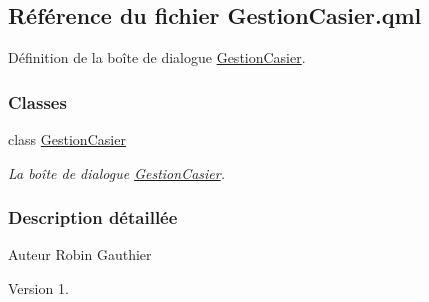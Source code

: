 \hypertarget{_gestion_casier_8qml}{}\subsection{Référence du fichier Gestion\+Casier.\+qml}
\label{_gestion_casier_8qml}


Définition de la boîte de dialogue \hyperlink{class_gestion_casier}{Gestion\+Casier}.  


\subsubsection*{Classes}
\begin{DoxyCompactItemize}
\item 
class \hyperlink{class_gestion_casier}{Gestion\+Casier}
\begin{DoxyCompactList}\small\item\em La boîte de dialogue \hyperlink{class_gestion_casier}{Gestion\+Casier}. \end{DoxyCompactList}\end{DoxyCompactItemize}


\subsubsection{Description détaillée}
\begin{DoxyAuthor}{Auteur}
Robin Gauthier
\end{DoxyAuthor}
\begin{DoxyVersion}{Version}
1. 
\end{DoxyVersion}
